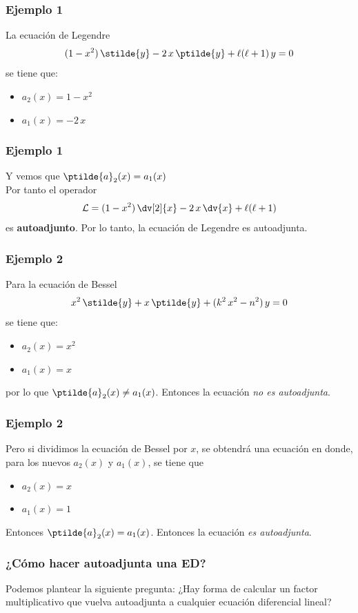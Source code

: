 \begin{frame}
\frametitle{Ejemplo 1}
La ecuación de Legendre
\begin{align*}
(1 - x^{2}) \, \stilde{y} - 2 \, x \, \ptilde{y} + \ell (\ell +  1) \, y = 0
\end{align*}
se tiene que:
\begin{itemize}[<+->]
\item $a_{2} (x)= 1 -x^{2}$
\item $a_{1} (x)= -2 \, x$
\end{itemize}
\end{frame}
\begin{frame}
\frametitle{Ejemplo 1}
Y vemos que $\ptilde{a}_{2} (x)= a_{1}(x)$
\\
\bigskip
\pause
Por tanto el operador
\begin{align*}
\mathcal{L} = (1 - x^{2}) \, \dv[2]{x} - 2 \, x \, \dv{x} + \ell(\ell + 1)
\end{align*}
es \textbf{autoadjunto}. \pause Por lo tanto, la ecuación de Legendre es autoadjunta.
\end{frame}
\begin{frame}
\frametitle{Ejemplo 2}
Para la ecuación de Bessel
\begin{align*}
x^{2} \, \stilde{y} + x \, \ptilde{y} + (k^{2} \, x^{2} - n^{2}) \, y = 0
\end{align*}
\pause
se tiene que:
\begin{itemize} [<+->]
\item $a_{2} (x)= x^{2}$
\item $a_{1} (x) = x$
\end{itemize}
\pause
por lo que $\ptilde{a}_{2}(x) \neq a_{1} (x)$. \pause Entonces la ecuación \emph{no es autoadjunta}.
\end{frame}
\begin{frame}
\frametitle{Ejemplo 2}
Pero si dividimos la ecuación de Bessel por $x$, se obtendrá una ecuación en donde, para los nuevos $a_{2}(x)$ y $a_{1}(x)$, \pause se tiene que
\begin{itemize} [<+->]
\item $a_{2} (x) = x$
\item $a_{1} (x) = 1$
\end{itemize}
\pause
Entonces $\ptilde{a}_{2}(x) = a_{1}(x)$. \pause Entonces la ecuación \emph{es autoadjunta}.
\end{frame}
\begin{frame}
\frametitle{¿Cómo hacer autoadjunta una ED?}
Podemos plantear la siguiente pregunta: ¿Hay forma de calcular un factor multiplicativo que vuelva autoadjunta a cualquier ecuación diferencial lineal?
\end{frame}
